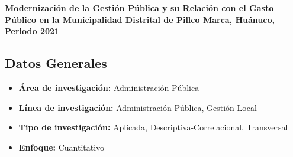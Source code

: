 \documentclass[
  man,
  floatsintext,
  longtable,
  a4paper,
  nolmodern,
  notxfonts,
  notimes,
  12pt,
  colorlinks=true,linkcolor=blue,citecolor=blue,urlcolor=blue]{apa7}
\providecommand{\tightlist}{%
  \setlength{\itemsep}{0pt}\setlength{\parskip}{0pt}}
\begin{document}
\textbf{Modernización de la Gestión Pública y su Relación con el Gasto
Público en la Municipalidad Distrital de Pillco Marca, Huánuco, Periodo
2021}

\subsection{Datos Generales}\label{datos-generales-8}

\begin{itemize}
\tightlist
\item
  \textbf{Área de investigación:} Administración Pública
\item
  \textbf{Línea de investigación:} Administración Pública, Gestión Local
\item
  \textbf{Tipo de investigación:} Aplicada, Descriptiva-Correlacional,
  Transversal
\item
  \textbf{Enfoque:} Cuantitativo
\end{itemize}
\end{document}
